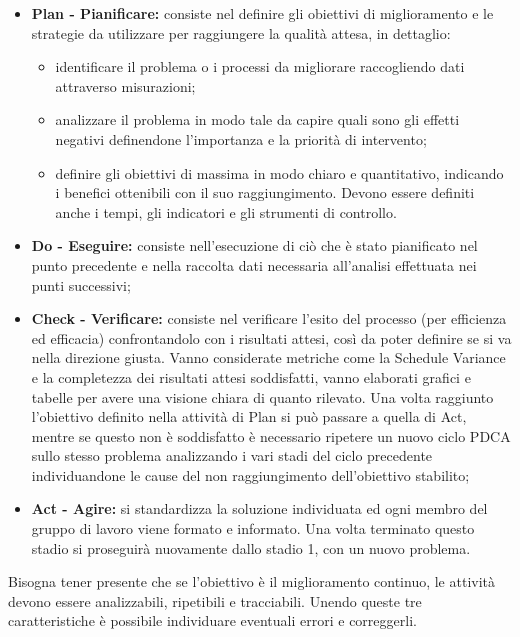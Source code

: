 \documentclass[PdQ.tex]{subfiles}
\begin{document}
\begin{itemize}
\item \textbf{Plan - Pianificare:} consiste nel definire gli obiettivi di miglioramento e le strategie da utilizzare per raggiungere la qualità attesa, in dettaglio:
\begin{itemize}
	\item identificare il problema o i processi da migliorare raccogliendo dati attraverso misurazioni;
	\item analizzare il problema in modo tale da capire quali sono gli effetti negativi definendone l'importanza e la priorità di intervento;
	\item definire gli obiettivi di massima in modo chiaro e quantitativo, indicando i benefici ottenibili con il suo raggiungimento. Devono essere definiti anche i tempi, gli indicatori e gli strumenti di controllo.
\end{itemize}
\item \textbf{Do - Eseguire:} consiste nell'esecuzione di ciò che è stato pianificato nel punto precedente e nella raccolta dati necessaria all'analisi effettuata nei punti successivi;
\item \textbf{ Check - Verificare:} consiste nel verificare l’esito del processo (per
efficienza ed efficacia) confrontandolo con i risultati attesi, così da poter definire se si va nella direzione giusta.  Vanno considerate metriche come la Schedule Variance e la completezza dei risultati attesi soddisfatti, vanno elaborati grafici e tabelle per avere una visione chiara di quanto rilevato. Una volta raggiunto l'obiettivo definito nella attività di Plan si può passare a quella di Act, mentre se questo non è soddisfatto è necessario ripetere un nuovo ciclo PDCA sullo stesso problema analizzando i vari stadi del ciclo precedente individuandone le cause del non raggiungimento dell’obiettivo stabilito;
\item \textbf{ Act - Agire:} si standardizza la soluzione individuata ed ogni membro del gruppo di lavoro viene formato e informato. Una volta terminato questo stadio si proseguirà nuovamente dallo stadio 1, con un nuovo problema.
\end{itemize}

Bisogna tener presente che se l’obiettivo è il miglioramento continuo, le attività devono essere analizzabili, ripetibili e tracciabili. Unendo queste tre caratteristiche è possibile individuare eventuali errori e correggerli.
\end{document}
